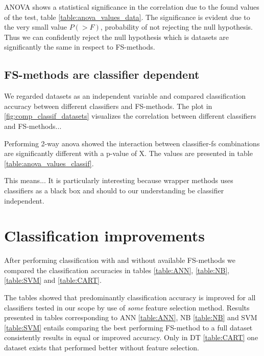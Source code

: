 

ANOVA shows a statistical significance in the correlation due to the found values of the test, table \ref{table:anova_values_data}. The significance is evident due to the very small value $P(>F)$, probability of not rejecting the null hypothesis. Thus we can confidently reject the null hypothesis which is datasets are significantly the same in respect to FS-methods.



\subsection{FS-methods are classifier dependent}

We regarded datasets as an independent variable and compared classification accuracy between different classifiers and FS-methods. The plot in \ref{fig:comp_classif_datasets} visualizes the correlation between different classifiers and FS-methods...

Performing 2-way anova showed the interaction between classifier-fs combinations are significantly different with a p-value of X. The values are presented in table \ref{table:anova_values_classif}.

This means... It is particularly interesting because wrapper methods uses classifiers as a black box and should to our understanding be classifier independent.




\section{Classification improvements}

After performing classification with and without available FS-methods we compared the classification accuracies in tables \ref{table:ANN}, \ref{table:NB}, \ref{table:SVM} and \ref{table:CART}.

The tables showed that predominantly classification accuracy is improved for all classifiers tested in our scope by use of \textit{some} feature selection method. Results presented in tables corresponding to ANN \ref{table:ANN}, NB \ref{table:NB} and SVM \ref{table:SVM} entails comparing the best performing FS-method to a full dataset consistently results in equal or improved accuracy. Only in DT \ref{table:CART} one dataset exists that performed better without feature selection.

